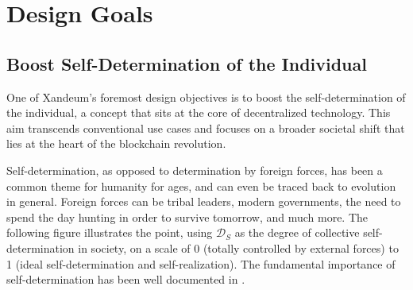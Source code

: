 \documentclass[11 pt]{article}   	%
\let\oldsection\section
\renewcommand{\section}{\clearpage\oldsection}
\begin{document}
\normalsize

\clearpage
\tableofcontents
\clearpage

\section{Design Goals}
\subsection{Boost Self-Determination of the Individual}
One of Xandeum's foremost design objectives is to boost the self-determination of the individual, a concept that sits at the core of decentralized technology. This aim transcends conventional use cases and focuses on a broader societal shift that lies at the heart of the blockchain revolution.

Self-determination, as opposed to determination by foreign forces, has been a common theme for humanity for ages, and can even be traced back to evolution in general. Foreign forces can be tribal leaders, modern governments, the need to spend the day hunting in order to survive tomorrow, and much more. The following figure illustrates the point, using $\mathcal{D}_{S}$ as the degree of collective self-determination in society, on a scale of 0 (totally controlled by external forces) to 1 (ideal self-determination and self-realization). The fundamental importance of self-determination has been well documented in \cite{ryandeci18}.

\ \\
\end{document}

